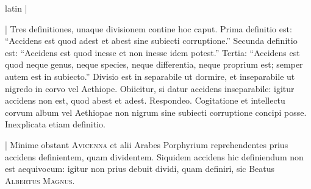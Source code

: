 \begin{otherlanguage*}{latin}
\pstart
\textnormal{|}  
\pend

\pstart
{}
\pend

\pstart
\noindent%
\textnormal{|} Tres definitiones, unaque divisionem contine hoc caput. Prima definitio est:
\enquote{Accidens est quod adest et abest sine subiecti corruptione.} Secunda definitio est:
\enquote{Accidens est quod inesse et non inesse idem potest.} Tertia:
\enquote{Accidens est quod neque genus, neque species, neque differentia, neque proprium est; semper autem est in subiecto.} Divisio est in separabile ut dormire, et inseparabile ut nigredo in corvo vel Aethiope. Obiicitur, si datur accidens inseparabile:
igitur accidens non est, quod abest et adest. Respondeo. Cogitatione et intellectu corvum album vel Aethiopae non nigrum sine subiecti corruptione concipi posse. Inexplicata etiam definitio. 
\pend

\pstart
{}
\pend

\pstart
\noindent%
\textnormal{|} Minime obstant \textsc{Avicenna} et alii Arabes Porphyrium reprehendentes prius accidens definientem, quam dividentem. Siquidem accidens hic definiendum non est aequivocum:
igitur non prius debuit dividi, quam definiri, sic Beatus \textsc{Albertus Magnus}. 
\pend


\end{otherlanguage*}
